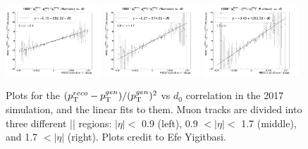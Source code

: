 \begin{figure}[!htb]
      \centering
      \captionsetup{justification=justified}
      \includegraphics[width=0.32\textwidth]{pics/muon_corr/GeoFit/fit_results/2017_DY_eta_0_0p9_dRelPt2p0_Roch.png}
      \includegraphics[width=0.32\textwidth]{pics/muon_corr/GeoFit/fit_results/2017_DY_eta_0p9_1p7_dRelPt2p0_Roch.png}
      \includegraphics[width=0.32\textwidth]{pics/muon_corr/GeoFit/fit_results/2017_DY_eta_1p7_inf_dRelPt2p0_Roch.png}
      \caption{Plots for the $(p_{\mathrm{T}}^{reco}-p_{\mathrm{T}}^{gen})/ (p_{\mathrm{T}}^{gen})^{2}$ vs $d_0$ correlation in the 2017 \DY simulation, 
               and the linear fits to them. Muon tracks are divided into three different |\eta| regions:
               $|\eta| <$ 0.9 (left), 0.9 $< |\eta| <$ 1.7 (middle), and 1.7 $< |\eta|$ (right).
               Plots credit to Efe Yigitbasi.}
      \label{fig:geofit_param_2017}
\end{figure}

